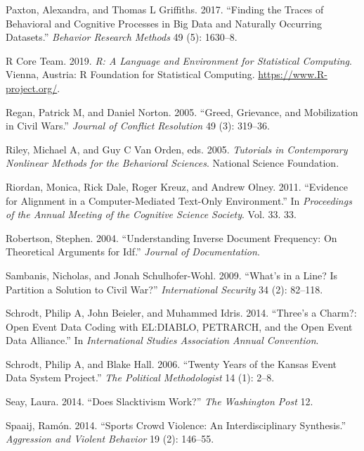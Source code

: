 \documentclass[
  english,
  man]{apa6}
\begin{document}
\leavevmode\hypertarget{ref-paxton2017finding}{}%
Paxton, Alexandra, and Thomas L Griffiths. 2017. ``Finding the Traces of Behavioral and Cognitive Processes in Big Data and Naturally Occurring Datasets.'' \emph{Behavior Research Methods} 49 (5): 1630--8.

\leavevmode\hypertarget{ref-R-base}{}%
R Core Team. 2019. \emph{R: A Language and Environment for Statistical Computing}. Vienna, Austria: R Foundation for Statistical Computing. \url{https://www.R-project.org/}.

\leavevmode\hypertarget{ref-regan2005greed}{}%
Regan, Patrick M, and Daniel Norton. 2005. ``Greed, Grievance, and Mobilization in Civil Wars.'' \emph{Journal of Conflict Resolution} 49 (3): 319--36.

\leavevmode\hypertarget{ref-riley2005tutorials}{}%
Riley, Michael A, and Guy C Van Orden, eds. 2005. \emph{Tutorials in Contemporary Nonlinear Methods for the Behavioral Sciences}. National Science Foundation.

\leavevmode\hypertarget{ref-riordan2011evidence}{}%
Riordan, Monica, Rick Dale, Roger Kreuz, and Andrew Olney. 2011. ``Evidence for Alignment in a Computer-Mediated Text-Only Environment.'' In \emph{Proceedings of the Annual Meeting of the Cognitive Science Society}. Vol. 33. 33.

\leavevmode\hypertarget{ref-robertson2004understanding}{}%
Robertson, Stephen. 2004. ``Understanding Inverse Document Frequency: On Theoretical Arguments for Idf.'' \emph{Journal of Documentation}.

\leavevmode\hypertarget{ref-sambanis2009s}{}%
Sambanis, Nicholas, and Jonah Schulhofer-Wohl. 2009. ``What's in a Line? Is Partition a Solution to Civil War?'' \emph{International Security} 34 (2): 82--118.

\leavevmode\hypertarget{ref-schrodt2014three}{}%
Schrodt, Philip A, John Beieler, and Muhammed Idris. 2014. ``Three's a Charm?: Open Event Data Coding with EL:DIABLO, PETRARCH, and the Open Event Data Alliance.'' In \emph{International Studies Association Annual Convention}.

\leavevmode\hypertarget{ref-schrodt2006twenty}{}%
Schrodt, Philip A, and Blake Hall. 2006. ``Twenty Years of the Kansas Event Data System Project.'' \emph{The Political Methodologist} 14 (1): 2--8.

\leavevmode\hypertarget{ref-seay2014slacktivism}{}%
Seay, Laura. 2014. ``Does Slacktivism Work?'' \emph{The Washington Post} 12.

\leavevmode\hypertarget{ref-spaaij2014sports}{}%
Spaaij, Ramón. 2014. ``Sports Crowd Violence: An Interdisciplinary Synthesis.'' \emph{Aggression and Violent Behavior} 19 (2): 146--55.
\end{document}
